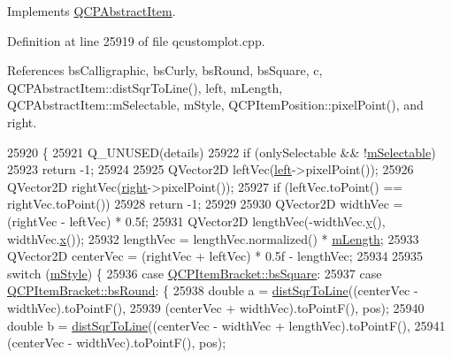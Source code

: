Implements \hyperlink{class_q_c_p_abstract_item_a96d522d10ffc0413b9a366c6f7f0476b}{Q\+C\+P\+Abstract\+Item}.



Definition at line 25919 of file qcustomplot.\+cpp.



References bs\+Calligraphic, bs\+Curly, bs\+Round, bs\+Square, c, Q\+C\+P\+Abstract\+Item\+::dist\+Sqr\+To\+Line(), left, m\+Length, Q\+C\+P\+Abstract\+Item\+::m\+Selectable, m\+Style, Q\+C\+P\+Item\+Position\+::pixel\+Point(), and right.


\begin{DoxyCode}
25920                                                            \{
25921   Q\_UNUSED(details)
25922   if (onlySelectable && !\hyperlink{class_q_c_p_abstract_item_ad81eb35c8726a0f458db9df9732e0e41}{mSelectable})
25923     return -1;
25924 
25925   QVector2D leftVec(\hyperlink{class_q_c_p_item_bracket_af6cc6d27d96171778c6927d6edce48b0}{left}->pixelPoint());
25926   QVector2D rightVec(\hyperlink{class_q_c_p_item_bracket_afa6c1360b05a50c4e0df37b3cebab6be}{right}->pixelPoint());
25927   if (leftVec.toPoint() == rightVec.toPoint())
25928     return -1;
25929 
25930   QVector2D widthVec = (rightVec - leftVec) * 0.5f;
25931   QVector2D lengthVec(-widthVec.\hyperlink{_comparision_pictures_2_createtest_image_8m_a2fb1c5cf58867b5bbc9a1b145a86f3a0}{y}(), widthVec.\hyperlink{_comparision_pictures_2_createtest_image_8m_a9336ebf25087d91c818ee6e9ec29f8c1}{x}());
25932   lengthVec = lengthVec.normalized() * \hyperlink{class_q_c_p_item_bracket_ab3d99bba8da18eb4d0e0cb23dded33b2}{mLength};
25933   QVector2D centerVec = (rightVec + leftVec) * 0.5f - lengthVec;
25934 
25935   switch (\hyperlink{class_q_c_p_item_bracket_ac911907184c824d621f274f8e0990080}{mStyle}) \{
25936   \textcolor{keywordflow}{case} \hyperlink{class_q_c_p_item_bracket_a7ac3afd0b24a607054e7212047d59dbda7f9df4a7359bfe3dac1dbe4ccf5d220c}{QCPItemBracket::bsSquare}:
25937   \textcolor{keywordflow}{case} \hyperlink{class_q_c_p_item_bracket_a7ac3afd0b24a607054e7212047d59dbda394627b0830a26ee3e0a02ca67a9f918}{QCPItemBracket::bsRound}: \{
25938     \textcolor{keywordtype}{double} a = \hyperlink{class_q_c_p_abstract_item_acdca343717d625b8abb3c3e38c0ed39d}{distSqrToLine}((centerVec - widthVec).toPointF(),
25939                              (centerVec + widthVec).toPointF(), pos);
25940     \textcolor{keywordtype}{double} b = \hyperlink{class_q_c_p_abstract_item_acdca343717d625b8abb3c3e38c0ed39d}{distSqrToLine}((centerVec - widthVec + lengthVec).toPointF(),
25941                              (centerVec - widthVec).toPointF(), pos);

\end{DoxyCode}
